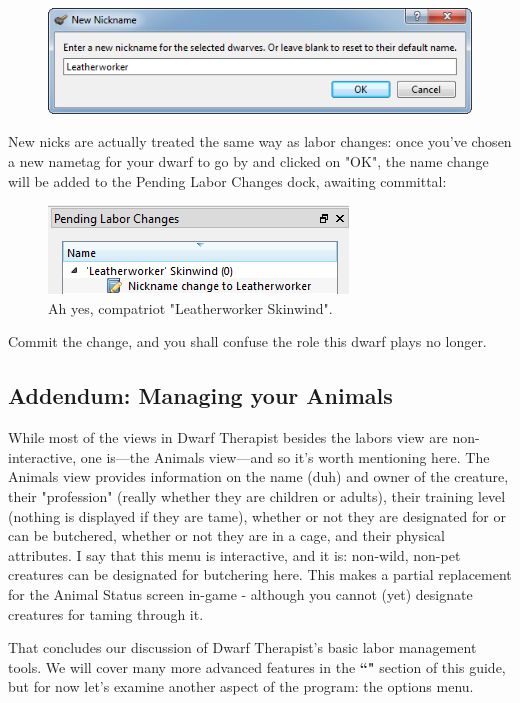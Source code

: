 \documentclass[]{article}
\begin{document}
\begin{figure}[h!] \centering
\includegraphics{Sec2Fig15}
\end{figure}

New nicks are actually treated the same way as labor changes: once you've chosen a new nametag for your
dwarf to go by and clicked on "OK", the name change will be added to the Pending Labor Changes dock,
awaiting committal:
\begin{figure}[h!] \centering
\includegraphics[scale=1]{Sec2Fig16}
\caption{Ah yes, compatriot "Leatherworker Skinwind".}
\end{figure}

Commit the change, and you shall confuse the role this dwarf plays no longer.

\subsection{Addendum: Managing your Animals}
While most of the views in Dwarf Therapist besides
the labors view are non-interactive, one is---the Animals view---and so it's worth mentioning here. The
Animals view provides information on the name (duh) and owner of the creature, their "profession" (really
whether they are children or adults), their training level (nothing is displayed if they are tame),
whether or not they are designated for or can be butchered, whether or not they are in a cage, and their
physical attributes. I say that this menu is interactive, and it is: non-wild, non-pet creatures can be
designated for butchering here. This makes a partial replacement for the Animal Status screen in-game -
although you cannot (yet) designate creatures for taming through it.

That concludes our discussion of Dwarf Therapist's basic labor management tools. We will cover many more
advanced features in the \textbf{``"} section of this guide, but for now
let's examine another aspect of the program: the options menu.
\end{document}
